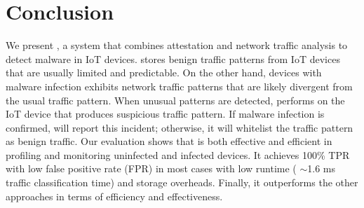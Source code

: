\section{Conclusion}\label{sec:conclusion}
We present \system{}, a system that combines attestation and network traffic analysis to detect malware in IoT devices. \system{} stores benign traffic patterns from IoT devices that are usually limited and predictable. On the other hand, devices with malware infection exhibits network traffic patterns that are likely divergent from the usual traffic pattern. When unusual patterns are detected, \system{} performs \ra{} on the IoT device that produces suspicious traffic pattern. If malware infection is confirmed, \system{} will report this incident; otherwise, it will whitelist the traffic pattern as benign traffic. 
Our evaluation shows that \system{} is both effective and efficient in profiling and monitoring uninfected and infected devices. It achieves 100\% TPR with low false positive rate (FPR) in most cases with low runtime (\ie{} $\sim$1.6 ms traffic classification time) and storage overheads. Finally, it outperforms the other approaches in terms of efficiency and effectiveness.